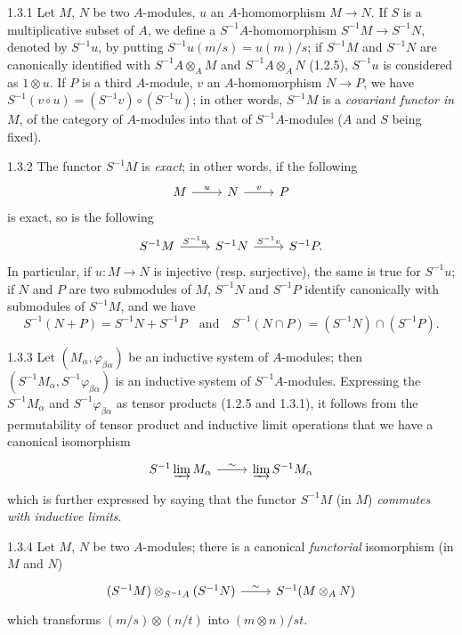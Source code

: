 \documentclass[../main.tex]{subfiles}
\begin{document}
\begin{cx}{1.3.1}
Let $M$, $N$ be two $A$-modules, $u$ an $A$-homomorphism $M\to N$. If $S$ is a multiplicative subset of $A$,
we define a $S^{-1}A$-homomorphism $S^{-1}M\to S^{-1}N$, denoted by $S^{-1}u$, by putting
$S^{-1}u(m/s)=u(m)/s$; if $S^{-1}M$ and $S^{-1}N$ are canonically identified with $S^{-1}A\otimes_A M$ and
$S^{-1}A\otimes_A N$ (1.2.5), $S^{-1}u$ is considered as $1\otimes u$. If $P$ is a third $A$-module,
$v$ an $A$-homomorphism $N\to P$, we have $S^{-1}(v\circ u)=(S^{-1}v)\circ(S^{-1}u)$; in other words,
$S^{-1}M$ is a \emph{covariant functor in} $M$, of the category of $A$-modules into that of $S^{-1}A$-modules
($A$ and $S$ being fixed).
\end{cx}

\begin{cx}{1.3.2}
The functor $S^{-1}M$ is \emph{exact}; in other words, if the following
\[\begin{tikzcd}
  M\ar[r,"u"] & N\ar[r,"v"] & P
\end{tikzcd}\]
is exact, so is the following
\[\begin{tikzcd}
  S^{-1}M\ar[r,"S^{-1}u"] & S^{-1}N\ar[r,"S^{-1}v"] & S^{-1}P.
\end{tikzcd}\]
In particular, if $u:M\to N$ is injective (resp. surjective), the same is true for $S^{-1}u$; if $N$ and $P$ are two
submodules of $M$, $S^{-1}N$ and $S^{-1}P$ identify canonically with submodules of $S^{-1}M$, and we have
\[
  S^{-1}(N+P)=S^{-1}N+S^{-1}P\quad\text{and}\quad S^{-1}(N\cap P)=(S^{-1}N)\cap(S^{-1}P).
\]
\end{cx}

\begin{cx}{1.3.3}
Let $(M_\alpha,\varphi_{\beta\alpha})$ be an inductive system of $A$-modules; then
$(S^{-1}M_\alpha,S^{-1}\varphi_{\beta\alpha})$ is an inductive system of $S^{-1}A$-modules.
Expressing the $S^{-1}M_\alpha$ and $S^{-1}\varphi_{\beta\alpha}$ as tensor products (1.2.5 and 1.3.1),
it follows from the permutability of tensor product and inductive limit operations that we have a canonical isomorphism
\[\begin{tikzcd}
  S^{-1}\varinjlim M_\alpha\ar[r,"\sim"] &\varinjlim S^{-1} M_\alpha
\end{tikzcd}\]
which is further expressed by saying that the functor $S^{-1}M$ (in $M$) \emph{commutes with inductive limits}.
\end{cx}

\begin{cx}{1.3.4}
Let $M$, $N$ be two $A$-modules; there is a canonical \emph{functorial} isomorphism (in $M$ and $N$)
\[\begin{tikzcd}
  (S^{-1}M)\otimes_{S^{-1}A}(S^{-1}N)\ar[r,"\sim"] &S^{-1}(M\otimes_A N)
\end{tikzcd}\]
which transforms $(m/s)\otimes(n/t)$ into $(m\otimes n)/st$.
\end{cx}
\end{document}
